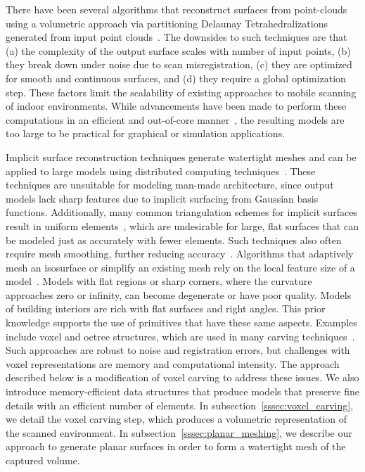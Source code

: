 \documentclass[journal]{IEEEtran}
\begin{document}
There have been several algorithms that reconstruct surfaces from point-clouds using a volumetric approach via partitioning Delaunay Tetrahedralizations generated from input point clouds~\cite{Powercrust,EigencrustShewchuk}.  The downsides to such techniques are that (a) the complexity of the output surface scales with number of input points, (b) they break down under noise due to scan misregistration, (c) they are optimized for smooth and continuous surfaces, and (d) they require a global optimization step.  These factors limit the scalability of existing approaches to mobile scanning of indoor environments.  While advancements have been made to perform these computations in an efficient and out-of-core manner~\cite{RealTimeEigenCrust,StreamingDelaunay}, the resulting models are too large to be practical for graphical or simulation applications.

Implicit surface reconstruction techniques generate watertight meshes and can be applied to large models using distributed computing techniques~\cite{Poisson,UnorganizedPoints,OutOfCorePoisson,ParallelPoisson}. These techniques are unsuitable for modeling man-made architecture, since output models lack sharp features due to implicit surfacing from Gaussian basis functions.  Additionally, many common triangulation schemes for implicit surfaces result in uniform elements~\cite{DualContouring,MarchingCubes}, which are undesirable for large, flat surfaces that can be modeled just as accurately with fewer elements.  Such techniques also often require mesh smoothing, further reducing accuracy~\cite{Carving}. Algorithms that adaptively mesh an isosurface or simplify an existing mesh rely on the local feature size of a model~\cite{QEM,ProgressiveMesh,Isostuffing,AdaptiveMeshing}.  Models with flat regions or sharp corners, where the curvature approaches zero or infinity, can become degenerate or have poor quality.  Models of building interiors are rich with flat surfaces and right angles.  This prior knowledge supports the use of primitives that have these same aspects.  Examples include voxel and octree structures, which are used in many carving techniques~\cite{OctreeSculpting,Carving,SpaceTime,VoxelSurfaceArea,Yang05,ParallelOctree}.  Such approaches are robust to noise and registration errors, but challenges with voxel representations are memory and computational intensity. The approach described below is a modification of voxel carving to address these issues.  We also introduce memory-efficient data structures that produce models that preserve fine details with an efficient number of elements.  In subsection~\ref{sssec:voxel_carving}, we detail the voxel carving step, which produces a volumetric representation of the scanned environment.  In subsection~\ref{sssec:planar_meshing}, we describe our approach to generate planar surfaces in order to form a watertight mesh of the captured volume.
\end{document}
